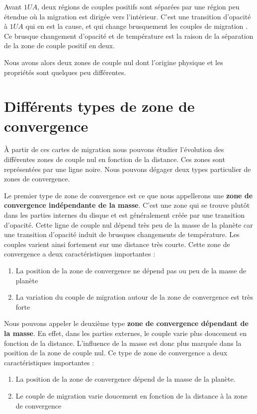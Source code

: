 \bigskip

Avant $1\unit{UA}$, deux régions de couples positifs sont séparées par une région peu étendue où la migration est dirigée vers l'intérieur. C'est une transition d'opacité à $1\unit{UA}$ qui
en est la cause, et qui change brusquement les couples de migration . Ce
brusque changement d'opacité et de température est la raison de la séparation de la zone de couple positif en deux. 

Nous avons alors deux zones de couple nul dont l'origine physique et les propriétés sont quelques peu différentes. 

\section{Différents types de zone de convergence}\label{sec:CZ-types}
À partir de ces cartes de migration nous pouvons étudier l'évolution des différentes zones de couple nul en fonction de la
distance. Ces zones sont représentées par une ligne noire. Nous pouvons dégager deux types particulier de zones de convergence. 

Le premier type de zone de convergence est ce que nous appellerons une \textbf{zone de convergence indépendante de la masse}. C'est une
zone qui se trouve plutôt dans les parties internes du disque et est généralement créée par une transition d'opacité. Cette ligne de couple nul dépend très peu de la masse de la
planète car une transition d'opacité induit de brusques changements de température. Les couples varient ainsi fortement sur une
distance très courte. Cette zone de convergence a deux caractéristiques importantes : 
\begin{enumerate}
\item La position de la zone de convergence ne dépend pas ou peu de la masse de planète
\item La variation du couple de migration autour de la zone de convergence est très forte
\end{enumerate}

Nous pouvons appeler le deuxième type \textbf{zone de convergence dépendant de la masse}. En effet, dans les parties externes, le
couple varie plus doucement en fonction de la distance. L'influence de la masse est donc plus marquée dans la position de la zone
de couple nul. Ce type de zone de convergence a deux caractéristiques importantes : 
\begin{enumerate}
\item La position de la zone de convergence dépend de la masse de la planète. 
\item Le couple de migration varie doucement en fonction de la distance à la zone de convergence
\end{enumerate}

